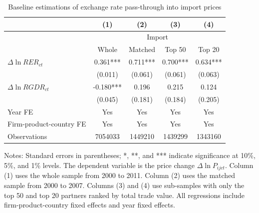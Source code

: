 \documentclass[12pt]{article}
\begin{document}
\begin{table}[htbp]
	\centering
	\caption{Baseline estimations of exchange rate pass-through into import prices}
	\begin{threeparttable}
		\begin{tabular}{lcccc}
			\toprule
			& (1)   & (2)   & (3)   & (4) \\
			\midrule
			& \multicolumn{4}{c}{Import} \\
			& Whole & Matched & Top 50 & Top 20 \\
			\midrule
			$\Delta \ln RER_{ct}$ & 0.361*** & 0.711*** & 0.700*** & 0.634***\\
			& (0.011) & (0.061) & (0.061) & (0.063)\\
			$\Delta \ln RGDR_{ct}$ & -0.180*** & 0.196 & 0.215 & 0.124\\
			& (0.045) & (0.181) & (0.184) & (0.205)\\
			Year FE  & Yes   & Yes   & Yes   & Yes \\
			Firm-product-country FE & Yes   & Yes   & Yes   & Yes \\
			Observations & 7054033 & 1449210 & 1439299 & 1343160 \\
			\bottomrule
		\end{tabular}
		\begin{tablenotes}
			\footnotesize
			\item[Notes:] Standard errors in parentheses; *, **, and *** indicate significance at 10\%, 5\%, and 1\% levels. The dependent variable is the price change $\Delta \ln P_{ijct}$. Column (1) uses the whole sample from 2000 to 2011. Column (2) uses the matched sample from 2000 to 2007. Columns (3) and (4) use sub-samples with only the top 50 and top 20 partners ranked by total trade value. All regressions include firm-product-country fixed effects and year fixed effects. 
		\end{tablenotes}
	\end{threeparttable}
	\label{tab.baseline}
\end{table}
\end{document}
